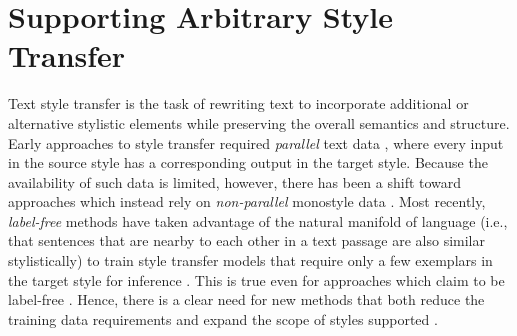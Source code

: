\section{Supporting Arbitrary Style Transfer}
\label{section:style_transfer}

Text style transfer is the task of rewriting text to incorporate additional or alternative stylistic elements while preserving the overall semantics and structure.
Early approaches to style transfer required \textit{parallel} text data \citep{zhu-etal-2010-monolingual,rao-tetreault-2018-dear}, where every input in the source style has a corresponding output in the target style.
Because the availability of such data is limited, however, there has been a shift toward approaches which instead rely on \textit{non-parallel} monostyle data \cite{li-etal-2018-delete,jin-etal-2019-imat, liu2020revision,style-transfer-as-paraphrase-2020}.
Most recently, \textit{label-free} methods have taken advantage of the natural manifold of language (i.e., that sentences that are nearby to each other in a text passage are also similar stylistically) to train style transfer models that require only a few exemplars in the target style for inference \citep{DBLP:journals/corr/abs-1905-11975, DBLP:journals/corr/abs-2010-03802}.
This is true even for approaches which claim to be label-free \citep{DBLP:journals/corr/abs-1905-11975,DBLP:journals/corr/abs-2010-03802}.
Hence, there is a clear need for new methods that both reduce the training data requirements and expand the scope of styles supported \citep{DBLP:journals/corr/abs-2011-00416,DBLP:journals/corr/abs-2010-12742}.

